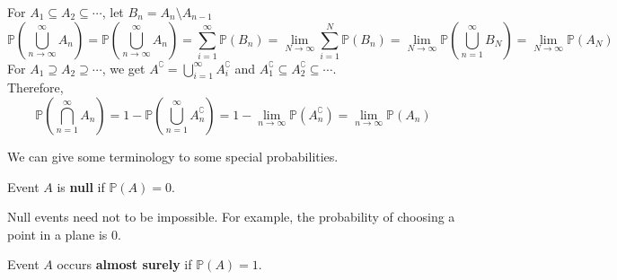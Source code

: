 \documentclass{huhtakm-template-book}
\newcommand{\prob}{\mathbb{P}}
\begin{document}
    \begin{proofing}
    For $A_{1}\subseteq A_{2}\subseteq\cdots$, let $B_{n}=A_{n}\setminus A_{n-1}$
        \begin{equation*}
            \prob\left(\bigcup_{n\to\infty}^{\infty}A_{n}\right)=\prob\left(\bigcup_{n\to\infty}^{\infty}A_{n}\right)=\sum_{i=1}^{\infty}\prob(B_{n})=\lim_{N\to\infty}\sum_{i=1}^{N}\prob(B_{n})=\lim_{N\to\infty}\prob\left(\bigcup_{n=1}^{\infty}B_{N}\right)=\lim_{N\to\infty}\prob(A_{N})
        \end{equation*}
        For $A_{1}\supseteq A_{2}\supseteq\cdots$, we get $A^{\complement}=\bigcup_{i=1}^{\infty}A_{i}^{\complement}$ and $A_{1}^{\complement}\subseteq A_{2}^{\complement}\subseteq\cdots$.\\
        Therefore,
        \begin{equation*}
            \prob\left(\bigcap_{n=1}^{\infty}A_{n}\right)=1-\prob\left(\bigcup_{n=1}^{\infty}A_{n}^{\complement}\right)=1-\lim_{n\to\infty}\prob(A_{n}^{\complement})=\lim_{n\to\infty}\prob(A_{n})
        \end{equation*}
    \end{proofing}
    We can give some terminology to some special probabilities.
    \begin{defn}
        Event $A$ is \textbf{null} if $\prob(A)=0$.
    \end{defn}
    \begin{rem}
        Null events need not to be impossible. For example, the probability of choosing a point in a plane is $0$.
    \end{rem}
    \begin{defn}
        Event $A$ occurs \textbf{almost surely} if $\prob(A)=1$.
    \end{defn}

\newpage
\end{document}
